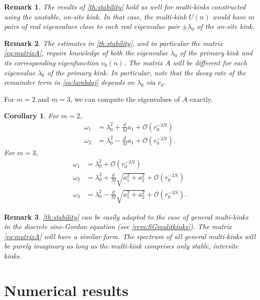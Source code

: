 \documentclass[12pt,reqno]{amsart}
\newtheorem{corollary}{Corollary}
\newtheorem{remark}{Remark}
\begin{document}
\begin{remark}\label{remark:unstablekink}
	The results of \cref{th:stability} hold as well for multi-kinks constructed using the unstable, on-site kink. In that case, the multi-kink $U(n)$ would have $m$ pairs of real eigenvalues close to each real eigenvalue pair $\pm \lambda_0$ of the on-site kink.
\end{remark}

\begin{remark}\label{remark:kk}
The estimates in \cref{th:stability}, and in particular the matrix \cref{eq:matrixA}, require knowledge of both the eigenvalue $\lambda_0$ of the primary kink and its corresponding eigenfunction $v_0(n)$. The matrix $A$ will be different for each eigenvalue $\lambda_0$ of the primary kink. In particular, note that the decay rate of the remainder term in \cref{eq:lambdaj} depends on $\lambda_0$ via $r_0$.
\end{remark}

\noindent For $m = 2$ and $m = 3$, we can compute the eigenvalues of $A$ exactly.

\begin{corollary}\label{corr:m23}
For $m = 2$, 
\begin{align*}
	\omega_1 &= \lambda_0^2 + \frac{d}{M}a_1 + \mathcal{O}(r_0^{-3N}) \\
	\omega_2 &= \lambda_0^2 - \frac{d}{M}a_1 + \mathcal{O}(r_0^{-3N}).
\end{align*}
For $m = 3$,
\begin{align*}
	\omega_1 &= \lambda_0^2 + \mathcal{O}(r_0^{-3N}) \\
	\omega_2 &= \lambda_0^2 + \frac{d}{M}\sqrt{a_1^2 + a_2^2} + \mathcal{O}(r_0^{-3N}) \\
	\omega_3 &= \lambda_0^2 - \frac{d}{M}\sqrt{a_1^2 + a_2^2} + \mathcal{O}(r_0^{-3N}).
\end{align*}
\end{corollary}

\begin{remark}
\cref{th:stability} can be easily adapted to the case of general multi-kinks in the discrete sine-Gordon equation (see \cref{rem:SGmulitkinks}). The matrix \cref{eq:matrixA} will have a similar form. The spectrum of all general multi-kinks will be purely imaginary as long as the multi-kink comprises only stable, intersite kinks.
\end{remark}

\section{Numerical results}\label{sec:numerics}
\end{document}
